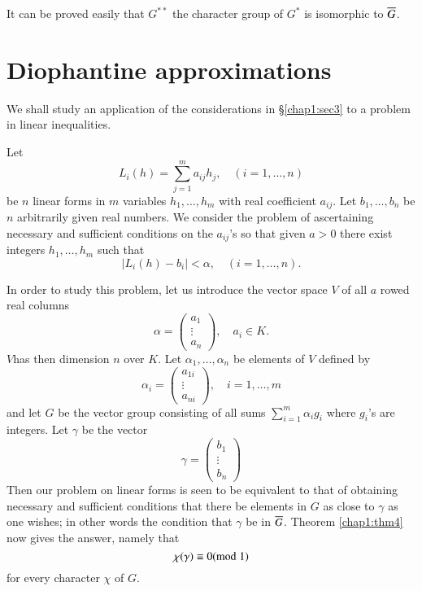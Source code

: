 It can be proved easily that $G^{\ast\ast}$ the character group of
$G^{\ast}$ is isomorphic to $\overline{G}$.

\section{Diophantine approximations}\label{chap1:sec4}

We shall study an application of the considerations in \S \ref{chap1:sec3} to a
problem in linear inequalities.

Let 
$$
L_{i}(h)=\sum^{m}_{j=1} a_{ij}h_{j},\quad (i=1,\ldots,n)
$$
be $n$ linear forms in $m$ variables $h_{1},\ldots,h_{m}$ with real
coefficient $a_{ij}$. Let $b_{1},\ldots,b_{n}$ be $n$ arbitrarily
given real numbers. We consider the problem of ascertaining necessary
and sufficient conditions on the $a_{ij}$'s so that given $a>0$ there
exist integers $h_{1},\ldots,h_{m}$ such that
$$
|L_{i}(h)-b_{i}|<\alpha,\quad (i=1,\ldots,n).
$$

In order to study this problem, let us introduce the vector space $V$
of all $a$ rowed real columns
$$
\alpha=
\begin{pmatrix}
a_{1}\\
\vdots\\
a_{n}
\end{pmatrix},\quad a_{i}\in K.
$$
$V$\pageoriginale has then dimension $n$ over $K$. Let
$\alpha_{1},\ldots,\alpha_{n}$ be elements of $V$ defined by
$$
\alpha_{i}=
\begin{pmatrix}
a_{1i}\\
\vdots\\
a_{ni}
\end{pmatrix},\quad
i=1,\ldots,m
$$
and let $G$ be the vector group consisting of all sums
$\sum\limits^{m}_{i=1}\alpha_{i}g_{i}$ where $g_{i}$'s are
integers. Let $\gamma$ be the vector 
$$
\gamma=
\begin{pmatrix}
b_{1}\\
\vdots\\
b_{n}
\end{pmatrix}
$$
Then our problem on linear forms is seen to be equivalent to that of
obtaining necessary and sufficient conditions that there be elements
in $G$ as close to $\gamma$ as one wishes; in other words the
condition that $\gamma$ be in $\overline{G}$. Theorem \ref{chap1:thm4} now gives
the answer, namely that
$$
\chi(\gamma)\equiv 0(\rm{mod} \; 1)
$$
for every character $\chi$ of $G$.

